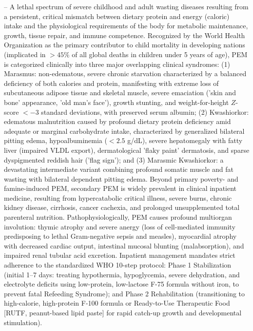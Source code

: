 -- A lethal spectrum of severe childhood and adult wasting diseases resulting from a persistent, critical mismatch between dietary protein and energy (caloric) intake and the physiological requirements of the body for metabolic maintenance, growth, tissue repair, and immune competence. Recognized by the World Health Organization as the primary contributor to child mortality in developing nations (implicated in $>45\%$ of all global deaths in children under 5 years of age), PEM is categorized clinically into three major overlapping clinical syndromes: (1) Marasmus: non-edematous, severe chronic starvation characterized by a balanced deficiency of both calories and protein, manifesting with extreme loss of subcutaneous adipose tissue and skeletal muscle, severe emaciation ('skin and bone' appearance, 'old man's face'), growth stunting, and weight-for-height $Z$-score $<-3$ standard deviations, with preserved serum albumin; (2) Kwashiorkor: edematous malnutrition caused by profound dietary protein deficiency amid adequate or marginal carbohydrate intake, characterized by generalized bilateral pitting edema, hypoalbuminemia ($<2.5$ g/dL), severe hepatomegaly with fatty liver (impaired VLDL export), dermatological 'flaky paint' dermatosis, and sparse dyspigmented reddish hair ('flag sign'); and (3) Marasmic Kwashiorkor: a devastating intermediate variant combining profound somatic muscle and fat wasting with bilateral dependent pitting edema. Beyond primary poverty- and famine-induced PEM, secondary PEM is widely prevalent in clinical inpatient medicine, resulting from hypercatabolic critical illness, severe burns, chronic kidney disease, cirrhosis, cancer cachexia, and prolonged unsupplemented total parenteral nutrition. Pathophysiologically, PEM causes profound multiorgan involution: thymic atrophy and severe anergy (loss of cell-mediated immunity predisposing to lethal Gram-negative sepsis and measles), myocardial atrophy with decreased cardiac output, intestinal mucosal blunting (malabsorption), and impaired renal tubular acid excretion. Inpatient management mandates strict adherence to the standardized WHO 10-step protocol: Phase 1 Stabilization (initial 1--7 days: treating hypothermia, hypoglycemia, severe dehydration, and electrolyte deficits using low-protein, low-lactose F-75 formula without iron, to prevent fatal Refeeding Syndrome); and Phase 2 Rehabilitation (transitioning to high-calorie, high-protein F-100 formula or Ready-to-Use Therapeutic Food [RUTF, peanut-based lipid paste] for rapid catch-up growth and developmental stimulation).

